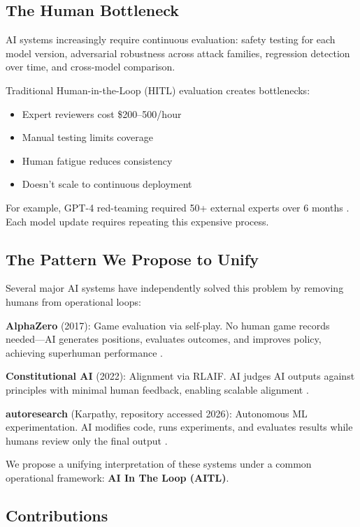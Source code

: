 \documentclass[11pt]{article}
\begin{document}
\subsection{The Human Bottleneck}

AI systems increasingly require continuous evaluation: safety testing for each model version, adversarial robustness across attack families, regression detection over time, and cross-model comparison.

Traditional Human-in-the-Loop (HITL) evaluation creates bottlenecks:
\begin{itemize}[nosep]
  \item Expert reviewers cost \$200--500/hour
  \item Manual testing limits coverage
  \item Human fatigue reduces consistency
  \item Doesn't scale to continuous deployment
\end{itemize}

For example, GPT-4 red-teaming required 50+ external experts over 6 months \citep{openai2023gpt4}. Each model update requires repeating this expensive process.

\subsection{The Pattern We Propose to Unify}

Several major AI systems have independently solved this problem by removing humans from operational loops:

\textbf{AlphaZero} (2017): Game evaluation via self-play. No human game records needed---AI generates positions, evaluates outcomes, and improves policy, achieving superhuman performance \citep{silver2017mastering}.

\textbf{Constitutional AI} (2022): Alignment via RLAIF. AI judges AI outputs against principles with minimal human feedback, enabling scalable alignment \citep{bai2022constitutional}.

\textbf{autoresearch} (Karpathy, repository accessed 2026): Autonomous ML experimentation. AI modifies code, runs experiments, and evaluates results while humans review only the final output \citep{karpathy2026autoresearch}.

We propose a unifying interpretation of these systems under a common operational framework: \textbf{AI In The Loop (AITL)}.

\subsection{Contributions}
\end{document}
